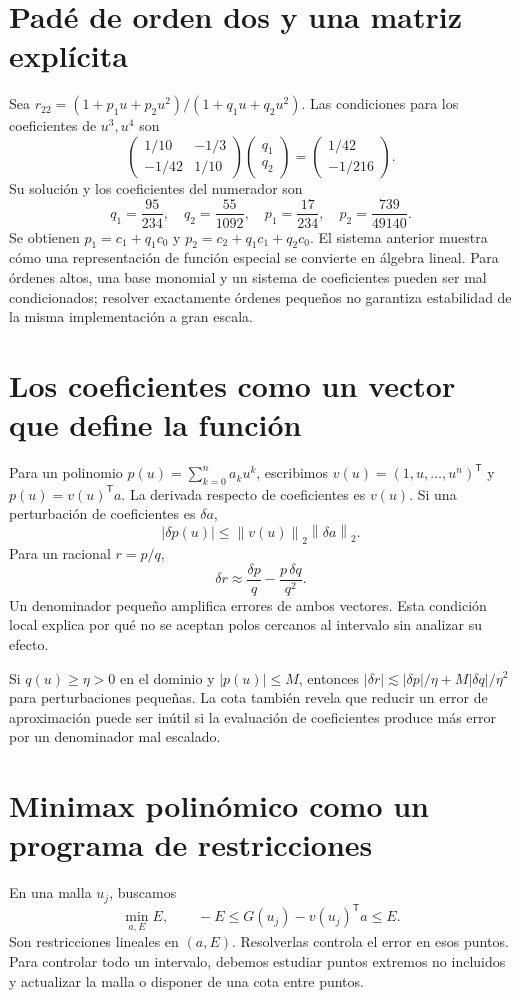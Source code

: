 \documentclass[11pt,a4paper]{article}
\newcommand{\T}{^{\mathsf T}}
\newcommand{\norm}[1]{\left\lVert #1\right\rVert}
\theoremstyle{definition}
\begin{document}
\section{Padé de orden dos y una matriz explícita}
Sea $r_{22}=(1+p_1u+p_2u^2)/(1+q_1u+q_2u^2)$.
Las condiciones para los coeficientes de $u^3,u^4$ son
\[
\begin{pmatrix}
1/10&-1/3\\
-1/42&1/10
\end{pmatrix}
\begin{pmatrix}q_1\\q_2\end{pmatrix}
=
\begin{pmatrix}1/42\\-1/216\end{pmatrix}.
\]
Su solución y los coeficientes del numerador son
\[
q_1=\frac{95}{234},\quad q_2=\frac{55}{1092},\quad
p_1=\frac{17}{234},\quad p_2=\frac{739}{49140}.
\]
Se obtienen $p_1=c_1+q_1c_0$ y $p_2=c_2+q_1c_1+q_2c_0$.
El sistema anterior muestra cómo una representación de función especial se convierte en álgebra lineal.
Para órdenes altos, una base monomial y un sistema de coeficientes pueden ser mal condicionados; resolver exactamente órdenes pequeños no garantiza estabilidad de la misma implementación a gran escala.

\section{Los coeficientes como un vector que define la función}
Para un polinomio $p(u)=\sum_{k=0}^na_ku^k$, escribimos
$v(u)=(1,u,\ldots,u^n)\T$ y $p(u)=v(u)\T a$.
La derivada respecto de coeficientes es $v(u)$.
Si una perturbación de coeficientes es $\delta a$,
\[
|\delta p(u)|\le\norm{v(u)}_2\norm{\delta a}_2.
\]
Para un racional $r=p/q$,
\[
\delta r\approx\frac{\delta p}{q}-\frac{p\,\delta q}{q^2}.
\]
Un denominador pequeño amplifica errores de ambos vectores.
Esta condición local explica por qué no se aceptan polos cercanos al intervalo sin analizar su efecto.

Si $q(u)\ge\eta>0$ en el dominio y $|p(u)|\le M$, entonces
$|\delta r|\lesssim|\delta p|/\eta+M|\delta q|/\eta^2$ para perturbaciones pequeñas.
La cota también revela que reducir un error de aproximación puede ser inútil si la evaluación de coeficientes produce más error por un denominador mal escalado.

\section{Minimax polinómico como un programa de restricciones}
En una malla $u_j$, buscamos
\[
\min_{a,E}E,\qquad
-E\le G(u_j)-v(u_j)\T a\le E.
\]
Son restricciones lineales en $(a,E)$.
Resolverlas controla el error en esos puntos.
Para controlar todo un intervalo, debemos estudiar puntos extremos no incluidos y actualizar la malla o disponer de una cota entre puntos.
\end{document}
